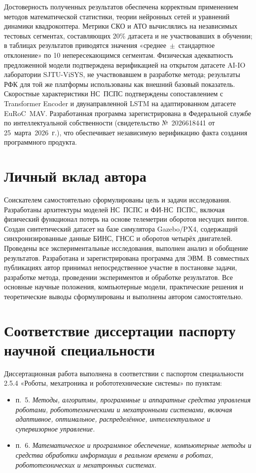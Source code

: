 Достоверность полученных результатов обеспечена корректным применением методов
математической статистики, теории нейронных сетей и уравнений динамики квадрокоптера.
Метрики СКО и АТО вычислялись на независимых тестовых сегментах, составляющих 20\%
датасета и не участвовавших в обучении; в таблицах результатов приводятся значения
«среднее~$\pm$~стандартное отклонение» по 10 непересекающимся сегментам.
Физическая адекватность предложенной модели подтверждена верификацией на открытом
датасете AI-IO лаборатории SJTU-ViSYS, не участвовавшем в разработке метода; результаты
РФК для той же платформы использованы как внешний базовый показатель.
Скоростные характеристики НС~ПСПС подтверждены сопоставлением с Transformer Encoder
и двунаправленной LSTM на адаптированном датасете EuRoC~MAV.
Разработанная программа зарегистрирована в Федеральной службе по интеллектуальной
собственности (свидетельство №~2026618441 от 25~марта~2026~г.), что обеспечивает
независимую верификацию факта создания программного продукта.


\section{Личный вклад автора}

Соискателем самостоятельно сформулированы цель и задачи исследования. Разработаны
архитектуры моделей НС~ПСПС и ФИ-НС~ПСПС, включая физический функционал потерь
на основе телеметрии оборотов несущих винтов. Создан синтетический датасет на базе
симулятора Gazebo/PX4, содержащий синхронизированные данные БИНС, ГНСС и оборотов
четырёх двигателей. Проведены все экспериментальные исследования, выполнен анализ
и обобщение результатов. Разработана и зарегистрирована программа для ЭВМ. В совместных
публикациях автор принимал непосредственное участие в постановке задачи, разработке
метода, проведении экспериментов и обработке результатов. Все основные научные
положения, компьютерные модели, практические решения и теоретические выводы
сформулированы и выполнены автором самостоятельно.

\section{Соответствие диссертации паспорту научной специальности}

Диссертационная работа выполнена в соответствии с паспортом специальности 2.5.4
«Роботы, мехатроника и робототехнические системы» по пунктам:

\begin{itemize}
	\item п.~5. \textit{Методы, алгоритмы, программные и аппаратные средства управления
		роботами, робототехническими и мехатронными системами, включая адаптивное,
		оптимальное, распределённое, интеллектуальное и супервизорное управление.}
	
	\item п.~6. \textit{Математическое и программное обеспечение, компьютерные методы
		и средства обработки информации в реальном времени в роботах, робототехнических
		и мехатронных системах.}
\end{itemize}


